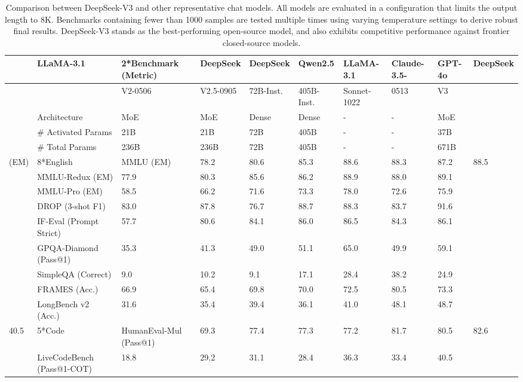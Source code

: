 \documentclass[11pt,a4paper]{article}
\begin{document}
\begin{table}[h]
\caption{Comparison between DeepSeek-V3 and other representative chat models. All models are evaluated in a configuration that limits the output length to 8K. Benchmarks containing fewer than 1000 samples are tested multiple times using varying temperature settings to derive robust final results. DeepSeek-V3 stands as the best-performing open-source model, and also exhibits competitive performance against frontier closed-source models.}
\begin{tabular}{|l|l|l|l|l|l|l|l|l|l|}
\hline
 & LLaMA-3.1 & 2*Benchmark (Metric) & DeepSeek & DeepSeek & Qwen2.5 & LLaMA-3.1 & Claude-3.5- & GPT-4o & DeepSeek \\ \hline
 &  & V2-0506 & V2.5-0905 & 72B-Inst. & 405B-Inst. & Sonnet-1022 & 0513 & V3 &  \\ \hline
 & Architecture & MoE & MoE & Dense & Dense & - & - & MoE &  \\ \hline
 & \# Activated Params & 21B & 21B & 72B & 405B & - & - & 37B &  \\ \hline
 & \# Total Params & 236B & 236B & 72B & 405B & - & - & 671B &  \\ \hline
(EM) & 8*English & MMLU (EM) & 78.2 & 80.6 & 85.3 & 88.6 & 88.3 & 87.2 & 88.5 \\ \hline
 & MMLU-Redux (EM) & 77.9 & 80.3 & 85.6 & 86.2 & 88.9 & 88.0 & 89.1 &  \\ \hline
 & MMLU-Pro (EM) & 58.5 & 66.2 & 71.6 & 73.3 & 78.0 & 72.6 & 75.9 &  \\ \hline
 & DROP (3-shot F1) & 83.0 & 87.8 & 76.7 & 88.7 & 88.3 & 83.7 & 91.6 &  \\ \hline
 & IF-Eval (Prompt Strict) & 57.7 & 80.6 & 84.1 & 86.0 & 86.5 & 84.3 & 86.1 &  \\ \hline
 & GPQA-Diamond (Pass@1) & 35.3 & 41.3 & 49.0 & 51.1 & 65.0 & 49.9 & 59.1 &  \\ \hline
 & SimpleQA (Correct) & 9.0 & 10.2 & 9.1 & 17.1 & 28.4 & 38.2 & 24.9 &  \\ \hline
 & FRAMES (Acc.) & 66.9 & 65.4 & 69.8 & 70.0 & 72.5 & 80.5 & 73.3 &  \\ \hline
 & LongBench v2 (Acc.) & 31.6 & 35.4 & 39.4 & 36.1 & 41.0 & 48.1 & 48.7 &  \\ \hline
40.5 & 5*Code & HumanEval-Mul (Pass@1) & 69.3 & 77.4 & 77.3 & 77.2 & 81.7 & 80.5 & 82.6 \\ \hline
 & LiveCodeBench (Pass@1-COT) & 18.8 & 29.2 & 31.1 & 28.4 & 36.3 & 33.4 & 40.5 &  \\ \hline

\end{tabular}
\end{table}
\end{document}
